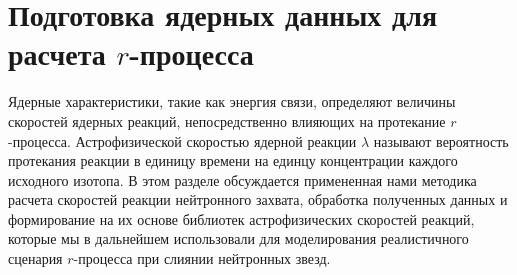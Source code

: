 \section{Подготовка ядерных данных для расчета $r$-процесса} 
Ядерные характеристики, такие как энергия связи, определяют величины скоростей ядерных реакций, непосредственно влияющих на протекание $r$-процесса. Астрофизической скоростью ядерной реакции $\lambda$ называют вероятность протекания реакции в единицу времени на единцу концентрации каждого исходного изотопа. В этом разделе обсуждается примененная нами методика расчета скоростей реакции нейтронного захвата, обработка полученных данных и формирование на их основе библиотек астрофизических скоростей реакций, которые мы в дальнейшем использовали для моделирования реалистичного сценария $r$-процесса при слиянии нейтронных звезд.




